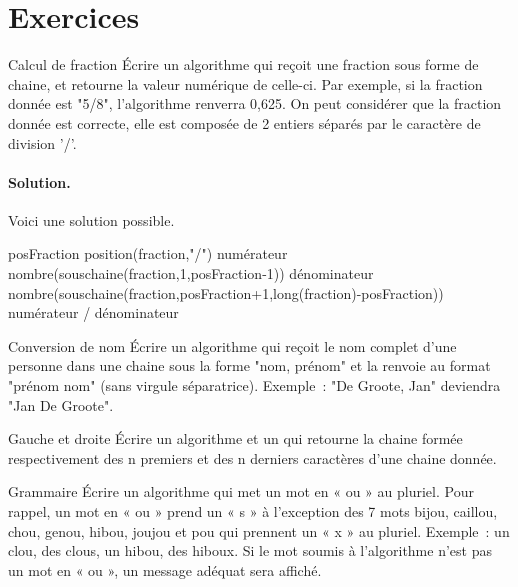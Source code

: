 \section{Exercices}

	\begin{Exercice}{Calcul de fraction}
		Écrire un algorithme 
		qui reçoit une fraction sous forme de chaine, 
		et retourne la valeur numérique de celle-ci. 
		Par exemple, si la fraction donnée est "5/8", 
		l’algorithme renverra 0,625. 
		On peut considérer que la fraction donnée est correcte, 
		elle est composée de 2 entiers séparés 
		par le caractère de division '/'.
		
		\paragraph{Solution.}
		Voici une solution possible.
		\begin{LDA}
				\Let posFraction \Gets position(fraction,"/")
				\Let numérateur \Gets nombre(souschaine(fraction,1,posFraction-1))
				\Let dénominateur \Gets nombre(souschaine(fraction,posFraction+1,long(fraction)-posFraction))
				\Return numérateur / dénominateur
			\EndAlgo
		\end{LDA}
	\end{Exercice}
	
	\begin{Exercice}{Conversion de nom}
		Écrire un algorithme 
		qui reçoit le nom complet d’une personne 
		dans une chaine sous la forme "nom, prénom" 
		et la renvoie au format "prénom nom" 
		(sans virgule séparatrice). 
		Exemple~: "De Groote, Jan" deviendra "Jan De Groote".	
	\end{Exercice}
	
	\begin{Exercice}{Gauche et droite}
		Écrire un algorithme  
		et un 
		qui retourne la chaine formée respectivement 
		des n premiers et des n derniers caractères d’une chaine donnée.	
	\end{Exercice}
	
	\begin{Exercice}{Grammaire}
		Écrire un algorithme 
		qui met un mot en « ou » au pluriel. 
		Pour rappel, 
		un mot en « ou » prend un « s » à l’exception des 7 mots 
		bijou, caillou, chou, genou, hibou, joujou et pou qui prennent 
		un « x » au pluriel. 
		Exemple~: un clou, des clous, un hibou, des hiboux. 
		Si le mot soumis à l’algorithme n’est pas un mot en « ou », 
		un message adéquat sera affiché.
	\end{Exercice}

